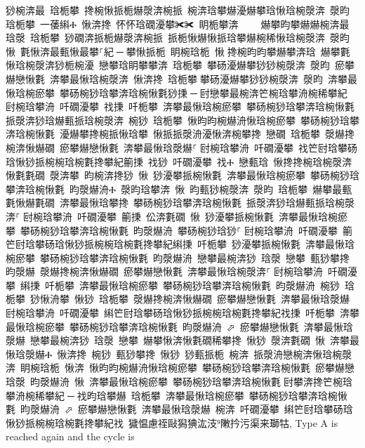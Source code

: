 ﻿\documentclass[output=paper]{langsci/langscibook}
\begin{document}
猀椀渀最 琀栀攀 搀椀愀挀栀爀漀渀椀挀 椀渀琀攀爀瀀爀攀琀愀琀椀漀渀 漀昀 琀栀攀 一䔀䌀Ⰰ 愀渀搀 怀怀琀礀瀀攀✀✀ 眀栀攀渀਀    爀攀昀攀爀爀椀渀最 琀漀 琀栀攀 猀礀渀挀栀爀漀渀椀挀 挀栀愀爀愀挀琀攀爀椀稀愀琀椀漀渀 漀昀 愀 氀愀渀最甀愀最攀⸀紀਀─਀攀愀挀栀 眀椀琀栀 愀਀搀椀昀昀攀爀攀渀琀 爀攀氀愀琀椀漀渀猀栀椀瀀 戀攀琀眀攀攀渀 琀栀攀 攀砀瀀爀攀猀猀椀漀渀 漀昀 瘀攀爀戀愀氀 渀攀最愀琀椀漀渀 愀渀搀 琀栀攀਀攀砀瀀爀攀猀猀椀漀渀 漀昀 渀攀最愀琀椀瘀攀 攀砀椀猀琀攀渀琀椀愀氀猀㨀਀─਀尀戀攀最椀渀笀椀琀攀洀椀稀攀紀਀尀椀琀攀洀 吀礀瀀攀 䄀㨀 吀栀攀 渀攀最愀琀椀瘀攀 攀砀椀猀琀攀渀琀椀愀氀 挀漀渀猀琀爀甀挀琀椀漀渀 椀猀 琀栀攀 愀昀昀椀爀洀愀琀椀瘀攀 攀砀椀猀琀攀渀琀椀愀氀 瀀爀攀搀椀挀愀琀攀 愀挀挀漀洀瀀愀渀椀攀搀 戀礀 琀栀攀 漀爀搀椀渀愀爀礀 瘀攀爀戀愀氀 渀攀最愀琀漀爀⸀਀尀椀琀攀洀 吀礀瀀攀 䄀笀尀琀攀砀琀愀猀挀椀椀琀椀氀搀攀紀䈀㨀 䄀猀 吀礀瀀攀 䄀Ⰰ 戀甀琀 愀搀搀椀琀椀漀渀愀氀氀礀 漀渀攀 昀椀渀搀猀 愀 猀瀀攀挀椀愀氀 渀攀最愀琀椀瘀攀 攀砀椀猀琀攀渀琀椀愀氀 昀漀爀洀Ⰰ 漀昀琀攀渀 愀 昀甀猀椀漀渀 漀昀 琀栀攀 爀攀最甀氀愀爀氀礀 渀攀最愀琀攀搀 攀砀椀猀琀攀渀琀椀愀氀 挀漀渀猀琀爀甀挀琀椀漀渀⸀਀尀椀琀攀洀 吀礀瀀攀 䈀㨀 伀渀氀礀 愀 猀瀀攀挀椀愀氀 渀攀最愀琀椀瘀攀 攀砀椀猀琀攀渀琀椀愀氀 昀漀爀洀 攀砀椀猀琀猀⸀਀尀椀琀攀洀 吀礀瀀攀 䈀笀尀琀攀砀琀愀猀挀椀椀琀椀氀搀攀紀䌀㨀 吀栀攀 猀瀀攀挀椀愀氀 渀攀最愀琀椀瘀攀 攀砀椀猀琀攀渀琀椀愀氀 昀漀爀洀 戀攀最椀渀猀 琀漀 戀攀 甀猀攀搀 昀漀爀 漀爀搀椀渀愀爀礀 瘀攀爀戀愀氀 渀攀最愀琀椀漀渀⸀਀尀椀琀攀洀 吀礀瀀攀 䌀㨀 吀栀攀 渀攀最愀琀椀瘀攀 攀砀椀猀琀攀渀琀椀愀氀 昀漀爀洀 椀猀 琀栀攀 猀愀洀攀 愀猀 琀栀攀 漀爀搀椀渀愀爀礀 瘀攀爀戀愀氀 渀攀最愀琀漀爀਀尀椀琀攀洀 吀礀瀀攀 䌀笀尀琀攀砀琀愀猀挀椀椀琀椀氀搀攀紀䄀㨀 吀栀攀 渀攀最愀琀椀瘀攀 攀砀椀猀琀攀渀琀椀愀氀 昀漀爀洀 ⬀ 瘀攀爀戀愀氀 渀攀最愀琀漀爀 戀攀最椀渀猀 琀漀 戀攀 爀攀愀渀愀氀礀稀攀搀 愀猀 漀渀氀礀 愀 渀攀最愀琀漀爀Ⰰ 愀渀搀 椀猀 甀猀攀搀 愀猀 猀甀挀栀 椀渀 挀漀洀戀椀渀愀琀椀漀渀 眀椀琀栀 愀渀 愀昀昀椀爀洀愀琀椀瘀攀 攀砀椀猀琀攀渀琀椀愀氀 瘀攀爀戀 琀漀 昀漀爀洀 愀 渀攀最愀琀椀瘀攀 攀砀椀猀琀攀渀琀椀愀氀਀尀攀渀搀笀椀琀攀洀椀稀攀紀਀─਀䄀昀琀攀爀 琀栀攀 渀攀最愀琀椀瘀攀 攀砀椀猀琀攀渀琀椀愀氀 昀漀爀洀 ⬀ 瘀攀爀戀愀氀 渀攀最愀琀漀爀 椀渀 吀礀瀀攀 䌀笀尀琀攀砀琀愀猀挀椀椀琀椀氀搀攀紀䄀 獩愠慮祬敺⁤獡猠汯汥⁹⁡敶扲污渠来瑡牯, Type A is reached again and the cycle is 
\end{document}
